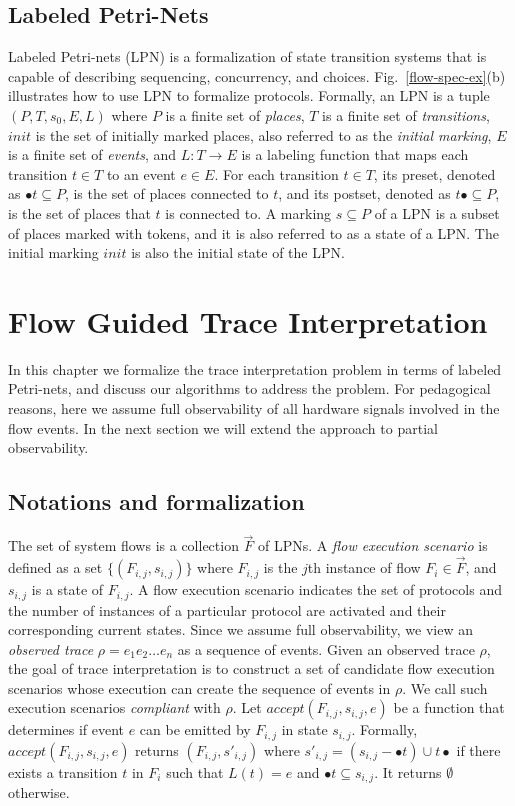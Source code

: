 \documentclass[12pt,frontmatter,copyright,thesis]{usfmanus}
\begin{document}
\section{Labeled Petri-Nets}
Labeled Petri-nets (LPN) is a formalization of state transition systems that is capable of describing sequencing, concurrency, and choices.  Fig.~\ref{flow-spec-ex}(b) illustrates how to use LPN to formalize protocols. Formally, an LPN is a tuple $(P, T, s_0, E, L)$ where $P$ is a finite set of {\em places}, $T$ is a finite set of {\em  transitions}, $\mathit{init}$ is the set of initially marked places, also referred to as the {\em initial  marking}, $E$ is a finite set of {\em events}, and $L: T \rightarrow E$ is a labeling function that maps each transition $t \in T$ to an event $e \in E$.  For each transition $t \in T$, its preset, denoted as $\bullet{t} \subseteq P$, is the set of places connected to $t$, and its postset, denoted as $t\bullet \subseteq P$, is the set of places that $t$ is connected to.  A marking $s \subseteq P$ of a LPN is a subset of places marked with tokens, and it is also referred to as a state of a LPN.  The initial marking $\mathit{init}$ is also the initial state of the LPN.





\chapter{Flow Guided Trace Interpretation}
In this chapter we formalize the trace interpretation problem in terms of labeled Petri-nets, and discuss our algorithms to address the problem. For pedagogical reasons, here we assume full observability of all hardware signals involved in the flow events. In the next section we will extend the approach to partial observability.



 
\section{Notations and formalization}  The set
of system flows is a collection ${\vec{F}}$ of
LPNs.  A {\em flow execution scenario} is defined as a
set $\{(F_{i,j}, s_{i,j})\}$ where $F_{i,j}$ is the
$j$th instance of flow $F_i \in {\vec{F}}$, and $s_{i,j}$ is
a state of $F_{i,j}$.  A flow execution scenario indicates
the set of protocols and the number of instances of a
particular protocol are activated and their corresponding
current states.  Since we assume full observability, we view
an {\em observed trace} $\rho = e_1e_2\ldots e_n$ as a
sequence of events.  Given an observed trace $\rho$, the
goal of trace interpretation is to construct a set of
candidate flow execution scenarios whose execution can
create the sequence of events in $\rho$.  We call such
execution scenarios {\em compliant} with $\rho$.  Let
$\mathit{accept(F_{i,j}, s_{i,j}, e)}$ be a function that
determines if event $e$ can be emitted by $F_{i,j}$ in state
$s_{i,j}$.  Formally, $\mathit{accept(F_{i,j}, s_{i,j}, e)}$
returns $(F_{i,j}, s'_{i,j})$ where $s'_{i,j} = (s_{i,j} - \bullet t)
\cup t\bullet$ if there exists a transition
$t$ in $F_i$ such that $L(t) = e$ and $\bullet t \subseteq
s_{i,j}$.  It returns $\emptyset$ otherwise.
\end{document}
